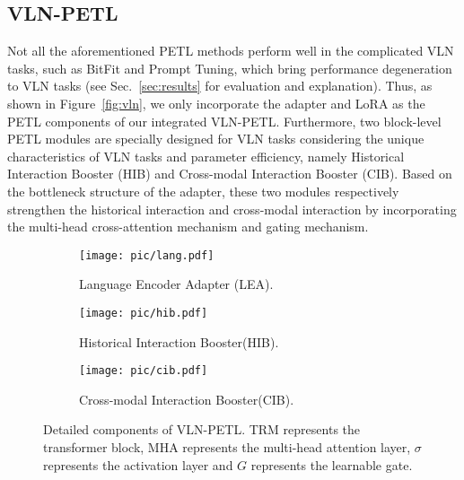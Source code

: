 \documentclass[10pt,twocolumn,letterpaper]{article}
\begin{document}
\subsection{VLN-PETL}
\vspace{-3pt}
Not all the aforementioned PETL methods perform well in the complicated VLN tasks, such as BitFit and Prompt Tuning, which bring performance degeneration to VLN tasks (see Sec.~\ref{sec:results} for evaluation and explanation).  Thus, as shown in Figure~\ref{fig:vln}, we only incorporate the adapter and LoRA as the PETL components of our integrated VLN-PETL. 
Furthermore, two block-level PETL modules are specially designed for VLN tasks considering the unique characteristics of VLN tasks and parameter efficiency, namely Historical Interaction Booster (HIB) and Cross-modal Interaction Booster (CIB). Based on the bottleneck structure of the adapter, these two modules respectively strengthen the historical interaction and cross-modal interaction by incorporating the multi-head cross-attention mechanism and gating mechanism. 



\begin{figure*}[!ht]
  \centering
  \begin{subfigure}{0.33\linewidth}
    \centering
\parbox[][5.5cm][c]{\linewidth}{
    \texttt{[image: pic/lang.pdf]}
    }
    \vspace{-2pt}
    \caption{Language Encoder Adapter (LEA).}
    \label{fig:lang}
  \end{subfigure}
  \hfill
  \begin{subfigure}{0.33\linewidth}
    \centering
\parbox[][5.5cm][c]{\linewidth}{
    \texttt{[image: pic/hib.pdf]}
    }
    \vspace{-2pt}
    \caption{Historical Interaction Booster(HIB).}
    \label{fig:hib}
  \end{subfigure}
  \hfill
  \begin{subfigure}{0.33\linewidth}
    \centering
\parbox[][5.5cm][c]{\linewidth}{
    \texttt{[image: pic/cib.pdf]}
    }
    \vspace{-2pt}
    \caption{Cross-modal Interaction Booster(CIB).}
    \label{fig:cib}
  \end{subfigure}
  \vspace{-15pt}
  \caption{Detailed components of VLN-PETL. TRM represents the transformer block, MHA represents the multi-head attention layer, $\sigma$ represents the activation layer and $G$ represents the learnable gate.}
  \label{fig:petl}
  \vspace{-15pt}
\end{figure*}
\end{document}
